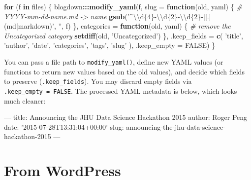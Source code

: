 \documentclass[12pt,]{krantz}
\makeatletter
\newenvironment{Shaded}{\begin{snugshade}}{\end{snugshade}}
\newcommand{\KeywordTok}[1]{\textcolor[rgb]{0.13,0.29,0.53}{\textbf{#1}}}
\newcommand{\DataTypeTok}[1]{\textcolor[rgb]{0.13,0.29,0.53}{#1}}
\newcommand{\CharTok}[1]{\textcolor[rgb]{0.31,0.60,0.02}{#1}}
\newcommand{\StringTok}[1]{\textcolor[rgb]{0.31,0.60,0.02}{#1}}
\newcommand{\CommentTok}[1]{\textcolor[rgb]{0.56,0.35,0.01}{\textit{#1}}}
\newcommand{\OtherTok}[1]{\textcolor[rgb]{0.56,0.35,0.01}{#1}}
\newcommand{\FunctionTok}[1]{\textcolor[rgb]{0.00,0.00,0.00}{#1}}
\newcommand{\ControlFlowTok}[1]{\textcolor[rgb]{0.13,0.29,0.53}{\textbf{#1}}}
\newcommand{\OperatorTok}[1]{\textcolor[rgb]{0.81,0.36,0.00}{\textbf{#1}}}
\newcommand{\AttributeTok}[1]{\textcolor[rgb]{0.77,0.63,0.00}{#1}}
\newcommand{\NormalTok}[1]{#1}
\newenvironment{kframe}{%
\medskip{}
\setlength{\fboxsep}{.8em}
 \def\at@end@of@kframe{}%
 \ifinner\ifhmode%
  \def\at@end@of@kframe{\end{minipage}}%
  \begin{minipage}{\columnwidth}%
 \fi\fi%
 \def\FrameCommand##1{\hskip\@totalleftmargin \hskip-\fboxsep
 \colorbox{shadecolor}{##1}\hskip-\fboxsep
     \hskip-\linewidth \hskip-\@totalleftmargin \hskip\columnwidth}%
 \MakeFramed {\advance\hsize-\width
   \@totalleftmargin\z@ \linewidth\hsize
   \@setminipage}}%
 {\par\unskip\endMakeFramed%
 \at@end@of@kframe}
\renewenvironment{Shaded}{\begin{kframe}}{\end{kframe}}
\theoremstyle{definition}
\theoremstyle{definition}
\theoremstyle{definition}
\theoremstyle{remark}
\makeatother
\begin{document}
\begin{Shaded}
\begin{Highlighting}[]
\ControlFlowTok{for}\NormalTok{ (f }\ControlFlowTok{in}\NormalTok{ files) \{}
\NormalTok{  blogdown}\OperatorTok{:::}\KeywordTok{modify_yaml}\NormalTok{(f, }\DataTypeTok{slug =} \ControlFlowTok{function}\NormalTok{(old, yaml) \{}
    \CommentTok{# YYYY-mm-dd-name.md -> name}
    \KeywordTok{gsub}\NormalTok{(}\StringTok{'^}\CharTok{\textbackslash{}\textbackslash{}}\StringTok{d\{4\}-}\CharTok{\textbackslash{}\textbackslash{}}\StringTok{d\{2\}-}\CharTok{\textbackslash{}\textbackslash{}}\StringTok{d\{2\}-|[.](md|markdown)'}\NormalTok{, }\StringTok{''}\NormalTok{, f)}
\NormalTok{  \}, }\DataTypeTok{categories =} \ControlFlowTok{function}\NormalTok{(old, yaml) \{}
    \CommentTok{# remove the Uncategorized category}
    \KeywordTok{setdiff}\NormalTok{(old, }\StringTok{'Uncategorized'}\NormalTok{)}
\NormalTok{  \}, }\DataTypeTok{.keep_fields =} \KeywordTok{c}\NormalTok{(}
    \StringTok{'title'}\NormalTok{, }\StringTok{'author'}\NormalTok{, }\StringTok{'date'}\NormalTok{, }\StringTok{'categories'}\NormalTok{, }\StringTok{'tags'}\NormalTok{, }\StringTok{'slug'}
\NormalTok{  ), }\DataTypeTok{.keep_empty =} \OtherTok{FALSE}\NormalTok{)}
\NormalTok{\}}
\end{Highlighting}
\end{Shaded}

You can pass a file path to \texttt{modify\_yaml()}, define new YAML
values (or functions to return new values based on the old values), and
decide which fields to preserve (\texttt{.keep\_fields}). You may
discard empty fields via \texttt{.keep\_empty\ =\ FALSE}. The processed
YAML metadata is below, which looks much cleaner:

\begin{Shaded}
\begin{Highlighting}[]
\OtherTok{---}
\FunctionTok{title:}\AttributeTok{ Announcing the JHU Data Science Hackathon 2015}
\FunctionTok{author:}\AttributeTok{ Roger Peng}
\FunctionTok{date:}\AttributeTok{ }\StringTok{'2015-07-28T13:31:04+00:00'}
\FunctionTok{slug:}\AttributeTok{ announcing-the-jhu-data-science-hackathon-2015}
\OtherTok{---}
\end{Highlighting}
\end{Shaded}

\section{From WordPress}\label{from-wordpress}
\end{document}
